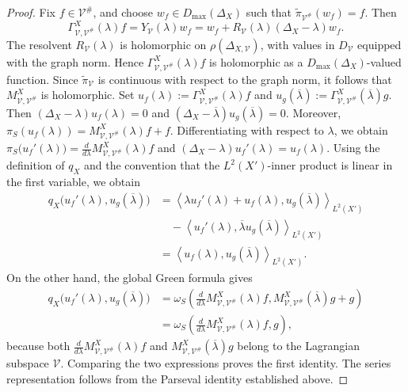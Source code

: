 \documentclass[12pt]{amsart}
\theoremstyle{plain}
\theoremstyle{definition}
\theoremstyle{remark}
\numberwithin{equation}{section} \numberwithin{figure}{section}
\begin{document}
\begin{proof}
Fix \(f\in\mathcal V^\#\), and choose
\(w_f\in D_{\max}(\Delta_X)\) such that
\(\widetilde{\pi}_{\mathcal V^\#}(w_f)=f\). Then
\[
\Gamma_{\mathcal V,\mathcal V^\#}^{X}(\lambda)f
=
Y_{\mathcal V}(\lambda)w_f
=
w_f+
R_{\mathcal V}(\lambda)(\Delta_X-\lambda)w_f.
\]
The resolvent \(R_{\mathcal V}(\lambda)\) is holomorphic on
\(\rho(\Delta_{X,\mathcal V})\), with values in
\(D_{\mathcal V}\) equipped with the graph norm. Hence
\(\Gamma_{\mathcal V,\mathcal V^\#}^{X}(\lambda)f\) is
holomorphic as a \(D_{\max}(\Delta_X)\)-valued function.
Since \(\widetilde{\pi}_{\mathcal V}\) is continuous with respect
to the graph norm, it follows that
\(M_{\mathcal V,\mathcal V^\#}^{X}\) is holomorphic.
Set
\(u_f(\lambda):=
\Gamma_{\mathcal V,\mathcal V^\#}^{X}(\lambda)f\) and
\(u_g(\overline{\lambda}):=
\Gamma_{\mathcal V,\mathcal V^\#}^{X}
(\overline{\lambda})g\).
Then
\((\Delta_X-\lambda)u_f(\lambda)=0\) and
\((\Delta_X-\overline{\lambda})
u_g(\overline{\lambda})=0\).
Moreover,
\(\pi_S(u_f(\lambda))
=M_{\mathcal V,\mathcal V^\#}^{X}(\lambda)f+f\).
Differentiating with respect to \(\lambda\), we obtain
\(
\pi_S\bigl(u_f'(\lambda)\bigr)
=
\frac{d}{d\lambda}
M_{\mathcal V,\mathcal V^\#}^{X}(\lambda)f
\)
and
\(
(\Delta_X-\lambda)u_f'(\lambda)=u_f(\lambda).
\)
Using the definition of \(q_X\) and the convention that the
\(L^2(X')\)-inner product is linear in the first variable, we obtain
\[
\begin{aligned}
q_X\bigl(u_f'(\lambda),u_g(\overline{\lambda})\bigr)
&=
\left\langle
\lambda u_f'(\lambda)+u_f(\lambda),
u_g(\overline{\lambda})
\right\rangle_{L^2(X')} \\
&\quad-
\left\langle
u_f'(\lambda),
\overline{\lambda}u_g(\overline{\lambda})
\right\rangle_{L^2(X')} \\
&=
\left\langle
u_f(\lambda),u_g(\overline{\lambda})
\right\rangle_{L^2(X')}.
\end{aligned}
\]
On the other hand, the global Green formula gives
\[
\begin{aligned}
q_X\bigl(u_f'(\lambda),u_g(\overline{\lambda})\bigr)
&=
\omega_S\left(
\frac{d}{d\lambda}
M_{\mathcal V,\mathcal V^\#}^{X}(\lambda)f,
M_{\mathcal V,\mathcal V^\#}^{X}
(\overline{\lambda})g+g
\right) \\
&=
\omega_S\left(
\frac{d}{d\lambda}
M_{\mathcal V,\mathcal V^\#}^{X}(\lambda)f,g
\right),
\end{aligned}
\]
because both
\(\frac{d}{d\lambda}
M_{\mathcal V,\mathcal V^\#}^{X}(\lambda)f\)
and
\(M_{\mathcal V,\mathcal V^\#}^{X}
(\overline{\lambda})g\)
belong to the Lagrangian subspace \(\mathcal V\).
Comparing the two expressions proves the first identity. The series
representation follows from the Parseval identity established above.
\end{proof}
\end{document}
